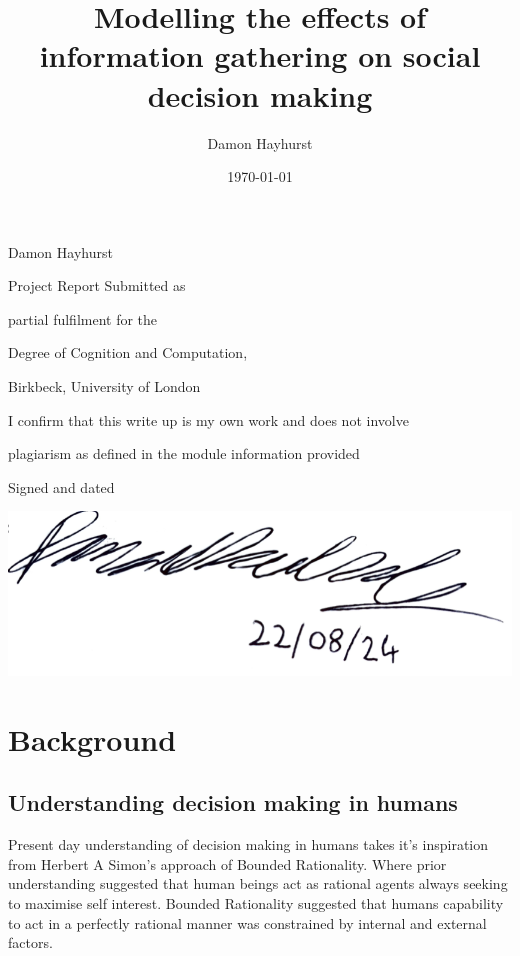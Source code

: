 \documentclass[man, floatsintext]{apa7}
\title{Modelling the effects of information gathering on social decision making}
\author{Damon Hayhurst}
\date{\today}
\makeatletter
\renewcommand{\maketitle}{
	\begin{titlepage}
		\centering
		\vspace*{0.4in}
		{\Huge \bfseries \@title \par}
		\vspace{0.2in}
		{\LARGE Damon Hayhurst \par}
		\vspace{0.3in}
		{\Large Project Report Submitted as\par}
		{\Large partial fulfilment for the\par}
		{\Large Degree of Cognition and Computation,\par}
		\vfill
		{\Large Birkbeck, University of London\par}
		{\Large \@date \par}
		\vfill
		{\Large
			\begin{center}
				I confirm that this write up is my own work and does not involve\par
				plagiarism as defined in the module information provided
			\end{center}
		}
		{\Large Signed and dated\par}
		\includegraphics[width=0.5\linewidth]{figures/sig.png}
	\end{titlepage}
}
\makeatother
\begin{document}
\raggedbottom
\maketitle


\abstract










\section{Background}

\subsection{Understanding decision making in humans}

Present day understanding of decision making in humans takes it's inspiration from Herbert A Simon's approach of Bounded Rationality. Where prior understanding suggested that human beings act as  rational agents always seeking to maximise self interest. Bounded Rationality suggested that humans capability to act in a perfectly rational manner was constrained by internal and external factors.

\end{document}
